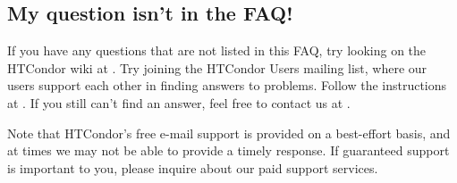 \subsection*{My question isn't in the FAQ!}

If you have any questions that are not listed in this FAQ, try looking
on the HTCondor wiki at
.
Try joining the HTCondor Users mailing list, where our users
support each other in finding answers to problems.
Follow the instructions at
.
If you still can't find an answer, feel free to contact us at
.

Note that HTCondor's free e-mail support is provided on a best-effort
basis, and at times we may not be able to provide a timely response.
If guaranteed support is important to you, please inquire about our
paid support services.



